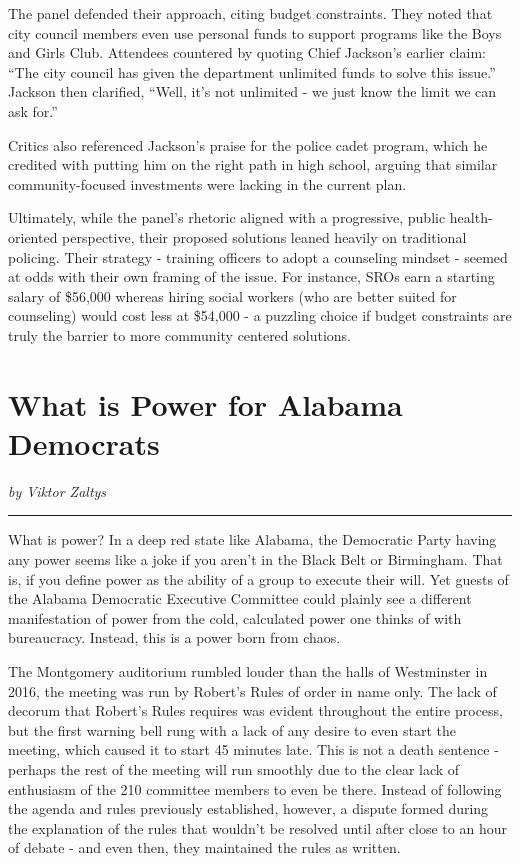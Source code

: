 \documentclass[
]{book}
\begin{document}
The panel defended their approach, citing budget constraints. They noted that city council members even use personal funds to support programs like the Boys and Girls Club. Attendees countered by quoting Chief Jackson's earlier claim: ``The city council has given the department unlimited funds to solve this issue.'' Jackson then clarified, ``Well, it's not unlimited - we just know the limit we can ask for.''

Critics also referenced Jackson's praise for the police cadet program, which he credited with putting him on the right path in high school, arguing that similar community-focused investments were lacking in the current plan.

Ultimately, while the panel's rhetoric aligned with a progressive, public health-oriented perspective, their proposed solutions leaned heavily on traditional policing. Their strategy - training officers to adopt a counseling mindset - seemed at odds with their own framing of the issue. For instance, SROs earn a starting salary of \$56,000 whereas hiring social workers (who are better suited for counseling) would cost less at \$54,000 - a puzzling choice if budget constraints are truly the barrier to more community centered solutions.

\section*{What is Power for Alabama Democrats}\label{what-is-power-for-alabama-democrats}

\emph{by Viktor Zaltys}

\begin{center}\rule{0.5\linewidth}{0.5pt}\end{center}

What is power? In a deep red state like Alabama, the Democratic Party having any power seems like a joke if you aren't in the Black Belt or Birmingham. That is, if you define power as the ability of a group to execute their will. Yet guests of the Alabama Democratic Executive Committee could plainly see a different manifestation of power from the cold, calculated power one thinks of with bureaucracy. Instead, this is a power born from chaos.

The Montgomery auditorium rumbled louder than the halls of Westminster in 2016, the meeting was run by Robert's Rules of order in name only. The lack of decorum that Robert's Rules requires was evident throughout the entire process, but the first warning bell rung with a lack of any desire to even start the meeting, which caused it to start 45 minutes late. This is not a death sentence - perhaps the rest of the meeting will run smoothly due to the clear lack of enthusiasm of the 210 committee members to even be there. Instead of following the agenda and rules previously established, however, a dispute formed during the explanation of the rules that wouldn't be resolved until after close to an hour of debate - and even then, they maintained the rules as written.
\end{document}
